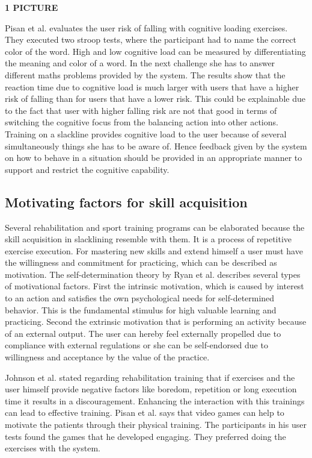 \textbf{1 PICTURE} \cite{Van_der_Spek2010-fe}

Pisan et al. \cite{Pisan2013-sf} evaluates the user risk of falling with cognitive loading exercises. They executed two stroop tests, where the participant had to name the correct color of the word. High and low cognitive load can be measured by differentiating the meaning and color of a word. In the next challenge she has to answer different maths problems provided by the system. The results show that the reaction time due to cognitive load is much larger with users that have a higher risk of falling than for users that have a lower risk. This could be explainable due to the fact that user with higher falling risk are not that good in terms of switching the cognitive focus from the balancing action into other actions. Training on a slackline provides cognitive load to the user because of several simultaneously things she has to be aware of. Hence feedback given by the system on how to behave in a situation should be provided in an appropriate manner to support and restrict the cognitive capability.

\subsection{Motivating factors for skill acquisition}

Several rehabilitation and sport training programs can be elaborated because the skill acquisition in slacklining resemble with them. It is a process of repetitive exercise execution. For mastering new skills and extend himself a user must have the willingness and commitment for practicing, which can be described as motivation. The self-determination theory by Ryan et al. \cite{Ryan2000-gi} \cite{Ryan2000-jn} describes several types of motivational factors. First the intrinsic motivation, which is caused by interest to an action and satisfies the own psychological needs for self-determined behavior. This is the fundamental stimulus for high valuable learning and practicing. Second the extrinsic motivation that is performing an activity because of an external output. The user can hereby feel externally propelled due to compliance with external regulations or she can be self-endorsed due to willingness and acceptance by the value of the practice. 

Johnson et al. \cite{Johnson1998-hb} stated regarding rehabilitation training that if exercises and the user himself provide negative factors like boredom, repetition or long execution time it results in a discouragement. Enhancing the interaction with this trainings can lead to effective training. 
Pisan et al. \cite{Pisan2013-sf} says that video games can help to motivate the patients through their physical training. The participants in his user tests found the games that he developed engaging. They preferred doing the exercises with the system.

